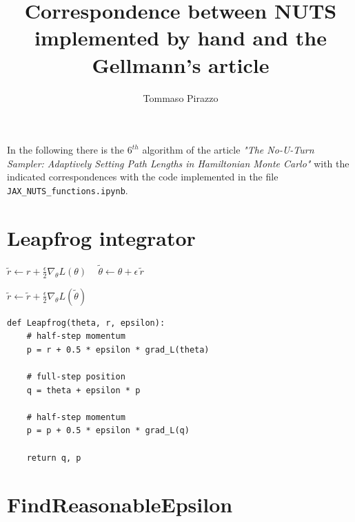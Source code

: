\documentclass[a4paper,12pt]{article}
\title{Correspondence between NUTS implemented by hand and the Gellmann's article}
\author{Tommaso Pirazzo}
\date{}
\newcommand{\BlueCommentInline}[1]{\tcp*{\textcolor{CommentBlue}{#1}}}
\begin{document}
	
	\maketitle
	
	In the following there is the $6^{th}$ algorithm of the article \emph{"The No-U-Turn Sampler: Adaptively Setting Path Lengths
	in Hamiltonian Monte Carlo"} with the indicated correspondences with the code implemented in the file \verb|JAX_NUTS_functions.ipynb|.
	\vspace{.5cm}

\section{Leapfrog integrator}

\begin{algorithm}[H]
	\caption{Leapfrog Integrator}
	
	$\tilde{r} \leftarrow r + \frac{\epsilon}{2} \nabla_{\theta} L(\theta)$
	\BlueCommentInline{$L(\theta) = \log p(\theta)$}\
	$\tilde{\theta} \leftarrow \theta + \epsilon \, \tilde{r}$\
	
	$\tilde{r} \leftarrow \tilde{r} + \frac{\epsilon}{2} \nabla_{\theta} L(\tilde{\theta})$ \
	\

\end{algorithm}

\vspace{.5cm}

\begin{lstlisting}
def Leapfrog(theta, r, epsilon):
	# half-step momentum
	p = r + 0.5 * epsilon * grad_L(theta)

	# full-step position
	q = theta + epsilon * p

	# half-step momentum
	p = p + 0.5 * epsilon * grad_L(q)

	return q, p
\end{lstlisting}
	
\section{FindReasonableEpsilon}
	
\end{document}

